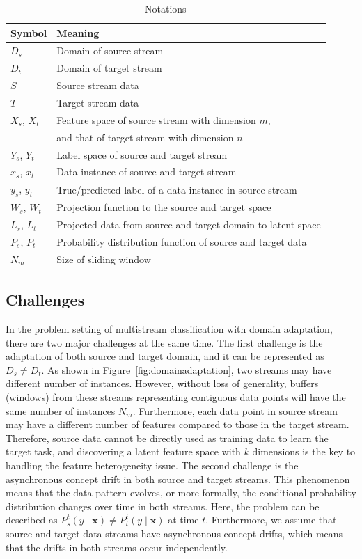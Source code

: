 \begin{table}[t]
\centering
\caption{Notations}
\label{tab:notations}
\begin{tabular}{|l|l|}
\hline
Symbol & Meaning \\ \hline
 $D_{s}$ & Domain of source stream \\ \hline
 $D_{t}$ & Domain of target stream \\ \hline
 $S$ & Source stream data\\ \hline
 $T$ & Target stream data \\ \hline
 $X_{s}$, $X_{t}$ & Feature space of source stream with dimension $m$, \\
  & and that of target stream with dimension $n$\\ \hline
 $Y_{s}$, $Y_{t}$ & Label space of source and target stream \\ \hline
 $x_{s}$, $x_{t}$ & Data instance of source and target stream \\ \hline
 $y_{s}$, $y_{t}$ & True/predicted label of a data instance in source stream \\ \hline
 $W_{s}$, $W_{t}$ & Projection function to the source and target space \\ \hline
 $L_{s}$, $L_{t}$ & Projected data from source and target domain to latent space \\ \hline
 $P_{s}$, $P_{t}$ & Probability distribution function of source and target data \\ \hline 
 $N_{m}$ & Size of sliding window \\ \hline
\end{tabular}
\end{table}

\subsection{Challenges}
In the problem setting of multistream classification with domain adaptation, there are two major challenges at the same time.
The first challenge is the adaptation of both source and target domain, and it can be represented as $D_{s} \neq D_{t}$. As shown in Figure~\ref{fig:domainadaptation}, two streams may have different number of instances. However, without loss of generality, buffers (windows) from these streams representing contiguous data points will have the same number of instances $N_m$. Furthermore, each data point in source stream may have a different number of features compared to those in the target stream. Therefore, source data cannot be directly used as training data to learn the target task, 
and discovering a latent feature space with $k$ dimensions is the key to handling the feature heterogeneity issue.
The second challenge is the asynchronous concept drift in both source and target streams. 
This phenomenon means that the data pattern evolves, or more formally, the conditional probability distribution changes over time in both streams. 
Here, the problem can be described as $P_{s}^{t}(y \mid \mathbf{x}) \neq P_{t}^{t}(y \mid \mathbf{x})$ at time $t$. Furthermore, we assume that source and target data streams have asynchronous concept drifts,
which means that the drifts in both streams occur independently. 

